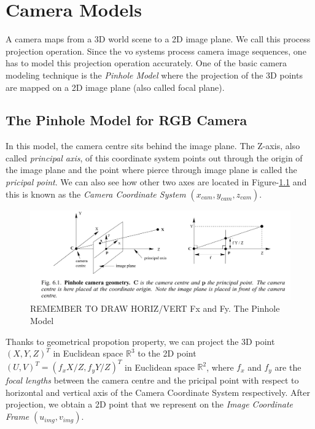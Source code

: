 \documentclass[a4paper]{report}
\numberwithin{figure}{section}
\begin{document}
\chapter{Camera Models} \label{cp_cam_models}

A camera maps from a 3D world scene to a 2D image plane. We call this process 
projection operation. Since the \acrshort{vo} systems process camera image 
sequences, one has to model this projection operation accurately. One of the 
basic camera modeling technique is the \textit{Pinhole Model} where the projection of 
the 3D points are mapped on a 2D image plane (also called focal plane). 

\section{The Pinhole Model for RGB Camera} \label{sbsc_pinhole}

In this model, the camera centre sits behind the image plane.
The Z-axis, 
also called \textit{principal axis}, of this 
coordinate system points out through the origin of the image plane and the 
point where pierce through image plane is called the \textit{pricipal point}. 
We can also see how other two axes are located in Figure-\ref{fig:pinhole} 
and this is known as the \textit{Camera Coordinate System} $(x_{cam}, y_{cam}, z_{cam})$.


\begin{figure}[H]
	\centering
	\includegraphics[width=\linewidth,natwidth=640,natheight=640]
  {fig/ref_imgs/pinhole_model.png}
  \caption{REMEMBER TO DRAW HORIZ/VERT Fx and Fy. The Pinhole Model}
	\label{fig:pinhole}
\end{figure}

Thanks to geometrical propotion property, we can project 
the 3D point $(X, Y, Z)^T$ in Euclidean space $\mathbb{R}^3$
to the 2D point $(U,V)^T = (f_xX/Z, f_yY/Z)^T$ in Euclidean space $\mathbb{R}^2$, 
where $f_x$ and $f_y$ are the \textit{focal lengths} 
between the camera centre and the pricipal 
point with respect to horizontal and vertical axis of the Camera Coordinate 
System respectively.
After projection, we obtain a 2D 
point that we represent on the 
\textit{Image Coordinate Frame} $(u_{img},v_{img})$.
\end{document}
